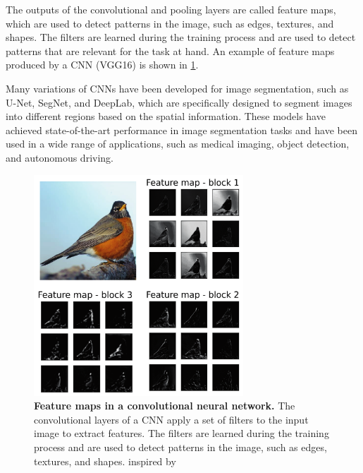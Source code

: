 The outputs of the convolutional and pooling layers are called feature maps,
which are used to detect patterns in the image, such as edges, textures, and
shapes. The filters are learned during the training process and are used to
detect patterns that are relevant for the task at hand. An example of feature
maps produced by a CNN (VGG16) is shown in \cref{fig:feature_maps}.

Many variations of CNNs have been developed for image segmentation, such as
U-Net, SegNet, and DeepLab, which are specifically designed to segment images
into different regions based on the spatial information. These models have
achieved state-of-the-art performance in image segmentation tasks and have been
used in a wide range of applications, such as medical imaging, object
detection, and autonomous driving.

\begin{figure}[H]
  \centering
  \includegraphics[width=0.7\textwidth]{Figures/feature_maps.pdf}
  \caption[Feature maps in a convolutional neural network]{
    \textbf{Feature maps in a convolutional neural network.} The convolutional
    layers of a CNN apply a set of filters to the input image to extract
    features. The filters are learned during the training process and are used
    to detect patterns in the image, such as edges, textures, and shapes.
    inspired by \cite{Brownlee2019}}
  \label{fig:feature_maps}
\end{figure}


